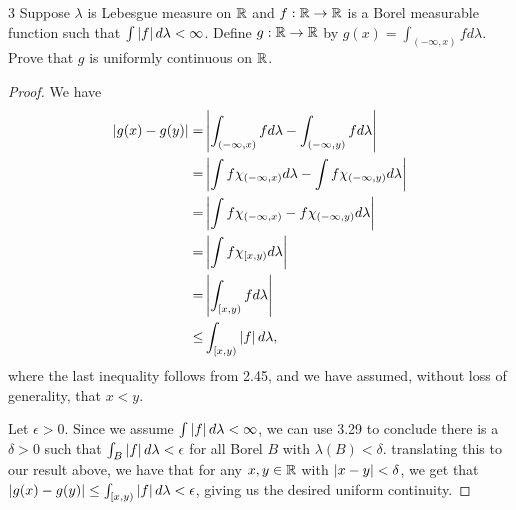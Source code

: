 \begin{exercise}{3}
Suppose $\lambda$ is Lebesgue measure on $\mathbb{R}$ and $f: \mathbb{R} \to \mathbb{R}$ is a Borel measurable function such that $\int \left\lvert f\right\rvert d\lambda < \infty$.
Define $g: \mathbb{R} \to \mathbb{R}$ by $g(x) = \int_(-\infty, x) f d\lambda$.
Prove that $g$ is uniformly continuous on $\mathbb{R}$.
\end{exercise}
\begin{proof}
We have 
\begin{align*}
    \left\lvert g(x) - g(y)\right\rvert
    =& \left\lvert \int_{(-\infty, x)}f d\lambda - \int_{(-\infty, y)}f d\lambda\right\rvert\\
    =& \left\lvert \int f\chi_{(-\infty, x)} d\lambda - \int f\chi_{(-\infty, y)} d\lambda\right\rvert\\
    =& \left\lvert \int f\chi_{(-\infty, x)} - f\chi_{(-\infty, y)} d\lambda\right\rvert\\
    =& \left\lvert \int f\chi_{[x, y)} d\lambda\right\rvert\\
    =& \left\lvert \int_{[x, y)} f d\lambda\right\rvert\\
    \leq& \int_{[x, y)}\left\lvert f\right\rvert d\lambda,
\end{align*}
where the last inequality follows from 2.45, and we have assumed, without loss of generality, that $x < y$.

Let $\epsilon > 0$.
Since we assume $\int \left\lvert f\right\rvert d\lambda < \infty$, we can use 3.29 to conclude there is a $\delta > 0$ such that $\int_B \left\lvert f\right\rvert d\lambda < \epsilon$ for all Borel $B$ with $\lambda(B) < \delta$.
translating this to our result above, we have that for any $x,y \in \mathbb{R}$ with $\left\lvert x - y\right\rvert < \delta$, we get that $\left\lvert g(x) - g(y)\right\rvert \leq \int_{[x, y)} \left\lvert f\right\rvert d\lambda < \epsilon$, giving us the desired uniform continuity.
\end{proof} 

